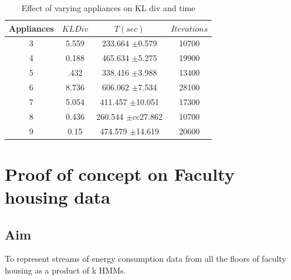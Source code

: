 \documentclass[10pt, conference, compsocconf]{IEEEtran}
\begin{document}
\begin{table}[htdp]
\begin{center}
\begin{tabular}{| c | c | c | c |}
\hline
Appliances & $KL Div$ & $T(sec)$ & $Iterations$ \\
\hline
3 & 5.559 & 233.664 $\pm$0.579 & 10700 \\
4 & 0.188 & 465.634 $\pm$5.275 & 19900 \\
5 & .432 & 338.416 $\pm$3.988  & 13400 \\
6 & 8.736 & 606.062 $\pm$7.534 & 28100 \\
7 & 5.054 & 411.457 $\pm$10.051 & 17300 \\
8 & 0.436 & 260.544 $\pm$cc27.862 & 10700 \\
9 & 0.15 & 474.579 $\pm$14.619 & 20600 \\
\hline
\end{tabular}
\end{center}
\caption{Effect of varying appliances on KL div and time}
\label{table: error}
\end{table}

\section{Proof of concept on Faculty housing data}
\label{sec:faculty}

\subsection{ Aim } To represent streams of energy consumption data from all the floors of faculty housing as a product of k HMMs. 
\end{document}
